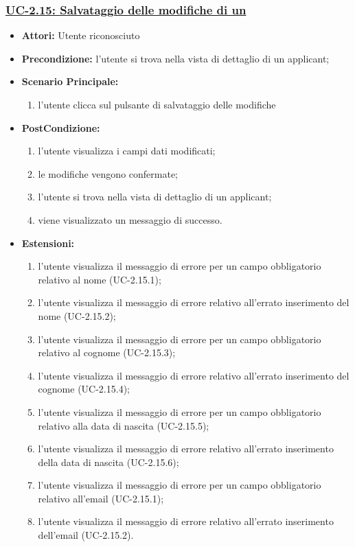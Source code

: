 \subsubsection{\underline{UC-2.15: Salvataggio delle modifiche di un \applicant}}
\begin{itemize}
	\item \textbf{Attori:} Utente riconosciuto
	\item \textbf{Precondizione:}  l'utente si trova nella vista di dettaglio di un applicant;
	\item \textbf{Scenario Principale:}
	\begin{enumerate}
		\item l'utente clicca sul pulsante di salvataggio delle modifiche
	\end{enumerate}
	\item \textbf{PostCondizione:} 
	\begin{enumerate}
		\item l'utente visualizza i campi dati modificati;
		\item le modifiche vengono confermate;
		\item l'utente si trova nella vista di dettaglio di un applicant;
		\item viene visualizzato un messaggio di successo.
	\end{enumerate}
	
	\item \textbf{Estensioni:} 
	\begin{enumerate}
		\item l'utente visualizza il messaggio di errore per un campo obbligatorio relativo al nome (UC-2.15.1);		
		\item l'utente visualizza il messaggio di errore relativo all'errato inserimento del nome (UC-2.15.2);
		\item l'utente visualizza il messaggio di errore per un campo obbligatorio relativo al cognome (UC-2.15.3);
		\item l'utente visualizza il messaggio di errore relativo all'errato inserimento del cognome (UC-2.15.4);
		\item l'utente visualizza il messaggio di errore per un campo obbligatorio relativo alla data di nascita (UC-2.15.5);		
		\item l'utente visualizza il messaggio di errore relativo all'errato inserimento della data di nascita (UC-2.15.6);	
		\item l'utente visualizza il messaggio di errore per un campo obbligatorio relativo all'email (UC-2.15.1);		
		\item l'utente visualizza il messaggio di errore relativo all'errato inserimento dell'email (UC-2.15.2).
	\end{enumerate}
\end{itemize}


